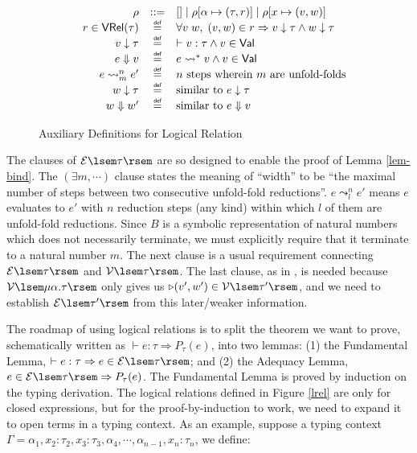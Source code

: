 \documentclass[preprint]{sigplanconf}
\newcommand{\relV}[1]{\mathcal{V}\lsem#1\rsem}
\newcommand{\relE}[1]{\mathcal{E}\lsem#1\rsem}
\newcommand{\later}{\triangleright}
\newcommand\defeq{\mathrel{\overset{\makebox[0pt]{\mbox{\normalfont\tiny\sffamily def}}}{=}}}
\begin{document}
\begin{figure}
$$\begin{array}{rrcl}
  & \rho &::=& [] \mid \rho[\alpha\mapsto(\tau,r)] \mid \rho[x\mapsto(v,w)]\\
  & r\in\mathsf{VRel}(\tau) &\defeq& \forall v\;w,\;(v,w)\in r \Rightarrow v\downarrow\tau \wedge w\downarrow\tau \\
  & v \downarrow \tau &\defeq& \vdash v:\tau \wedge v\in\mathsf{Val} \\
  & e \Downarrow v &\defeq& e\leadsto^*v \wedge v\in\mathsf{Val} \\
  & e \leadsto^n_m e' &\defeq& n\textrm{\ steps\ wherein\ }m\textrm{\ are\ unfold-folds} \\
  & w \downarrow \tau &\defeq& \textrm{similar to }e\downarrow\tau \\
  & w \Downarrow w' &\defeq& \textrm{similar to }e\Downarrow v \\
\end{array}$$
\caption{\label{lrel-aux}Auxiliary Definitions for Logical Relation}
\end{figure}

The clauses of $\relE{\tau}$ are so designed to enable the proof of Lemma \ref{lem-bind}. The $(\exists m,\cdots)$ clause states the meaning of ``width'' to be ``the maximal number of steps between two consecutive unfold-fold reductions''. $e\leadsto^n_l e'$ means $e$ evaluates to $e'$ with $n$ reduction steps (any kind) within which $l$ of them are unfold-fold reductions. Since $B$ is a symbolic representation of natural numbers which does not necessarily terminate, we must explicitly require that it terminate to a natural number $m$. The next clause is a usual requirement connecting $\relE{\tau}$ and $\relV{\tau}$. The last clause, as in \cite{dreyer2009logical}, is needed because $\relV{\mu\alpha.\tau}$ only gives us $\later (v',w') \in \relV{\tau'}$, and we need to establish $\relE{\tau'}$ from this later/weaker information.

The roadmap of using logical relations is to split the theorem we want to prove, schematically written as $\vdash e:\tau \Rightarrow P_\tau(e)$, into two lemmas: (1) the Fundamental Lemma, $\vdash e:\tau \Rightarrow e\in\relE{\tau}$; and (2) the Adequacy Lemma, $e\in\relE{\tau} \Rightarrow P_\tau(e)$. The Fundamental Lemma is proved by induction on the typing derivation. The logical relations defined in Figure \ref{lrel} are only for closed expressions, but for the proof-by-induction to work, we need to expand it to open terms in a typing context. As an example, suppose a typing context $\Gamma=\alpha_1,x_2:\tau_2,x_3:\tau_3,\alpha_4,\cdots,\alpha_{n-1},x_n:\tau_n$, we define:
\end{document}
